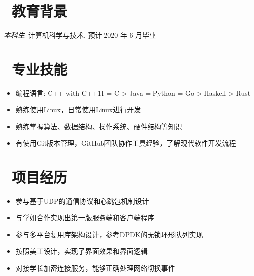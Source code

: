 \documentclass{resume}
\begin{document}



\section{\texorpdfstring{\faGraduationCap\ 教育背景}{教育背景}}
\textit{本科生}\ 计算机科学与技术, 预计 2020 年 6 月毕业

\section{\texorpdfstring{\faCogs\ 专业技能}{专业技能}}
\begin{itemize}[parsep=0.5ex]
  \item 编程语言: C++ with C++11 = C > Java = Python = Go > Haskell > Rust
  \item 熟练使用Linux，日常使用Linux进行开发
  \item 熟练掌握算法、数据结构、操作系统、硬件结构等知识
  \item 有使用Git版本管理，GitHub团队协作工具经验，了解现代软件开发流程
\end{itemize}

\section{\texorpdfstring{\faUsers\ 项目经历}{项目经历}}
\begin{itemize}
  \item 参与基于UDP的通信协议和心跳包机制设计
  \item 与学姐合作实现出第一版服务端和客户端程序
  \item 参与多平台复用库架构设计，参考DPDK的无锁环形队列实现
\end{itemize}

\begin{itemize}
  \item 按照美工设计，实现了界面效果和界面逻辑
  \item 对接学长加密连接服务，能够正确处理网络切换事件
\end{itemize}
\end{document}
